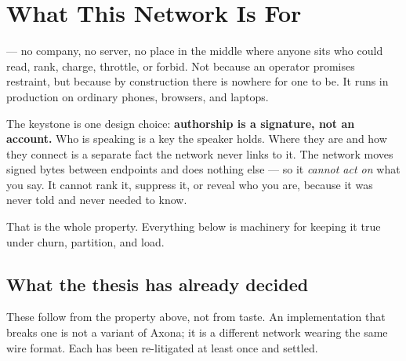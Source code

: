 \documentclass[nobib]{tufte-handout}
\begin{document}
\vspace{1em}

\section{What This Network Is For}\label{sec:thesis}

 --- no company,
no server, no place in the middle where anyone sits who could read, rank,
charge, throttle, or forbid. Not because an operator promises restraint, but
because by construction there is nowhere for one to be. It runs in
production on ordinary phones, browsers, and laptops.

The keystone is one design choice: \textbf{authorship is a signature, not an
account.} Who is speaking is a key the speaker holds. Where they are and how
they connect is a separate fact the network never links to it. The network
moves signed bytes between endpoints and does nothing else --- so it
\emph{cannot act on} what you say. It cannot rank it, suppress it, or reveal
who you are, because it was never told and never needed to know.

That is the whole property. Everything below is machinery for keeping it
true under churn, partition, and load.


\subsection{What the thesis has already decided}

These follow from the property above, not from taste. An implementation that
breaks one is not a variant of Axona; it is a different network wearing the
same wire format. Each has been re-litigated at least once and settled.
\end{document}

